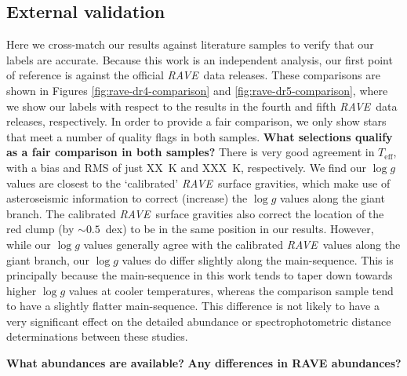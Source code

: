 \documentclass[preprint,trackchanges]{aastex}
\newcommand{\project}[1]{\textsl{#1}}
\newcommand{\rave}{\project{\acronym{RAVE}}}
\newcommand{\acronym}[1]{{\small{#1}}}
\newcommand{\stub}[1]{\textbf{#1}}
\newcommand{\teff}{T_{\mathrm{eff}}}
\newcommand{\logg}{\log g}
\begin{document}


\subsection{External validation}
\label{sec:external-validation}

Here we cross-match our results against literature samples to verify that
our labels are accurate.  Because this work is an independent analysis, our
first point of reference is against the official \rave\ data releases.  These
comparisons are shown in Figures \ref{fig:rave-dr4-comparison} and 
\ref{fig:rave-dr5-comparison}, where we show our labels with respect to the
results in the fourth and fifth \rave\ data releases, respectively.  In order
to provide a fair comparison, we only show stars that meet a number of quality
flags in both samples. 
\stub{What selections qualify as a fair comparison in both samples?}
There is very good agreement in $\teff$, with a bias
and RMS of just XX~K and XXX~K, respectively.  We find our $\logg$ values are
closest to the `calibrated' \rave\ surface gravities, which make use of 
asteroseismic information to correct (increase) the $\logg$ values along the
giant branch.  The calibrated \rave\ surface gravities also correct the 
location of the red clump (by $\sim0.5$~dex) to be in the same position in our
results.  However, while our $\logg$ values generally agree with the calibrated
\rave\ values along the giant branch, our $\logg$ values do differ slightly 
along the main-sequence.  This is principally because the main-sequence in 
this work tends to taper down towards higher $\logg$ values at cooler 
temperatures, whereas the comparison sample tend to have a slightly flatter
main-sequence.  This difference is not likely to have a very significant 
effect on the detailed abundance or spectrophotometric distance determinations
between these studies.

\stub{What abundances are available?}
\stub{Any differences in RAVE abundances?}


\end{document}
